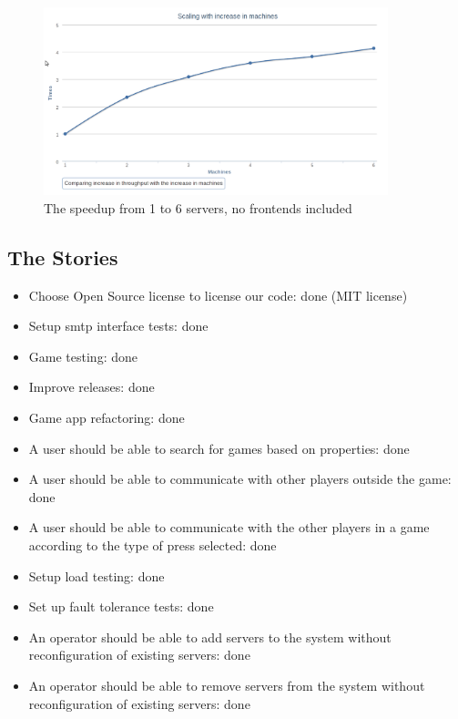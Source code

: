 \documentclass[11pt,a4paper]{article}
\begin{document}
\begin{figure}[h]
 \centering
 \includegraphics[width=10cm,keepaspectratio=true]{./scale.png}
 \caption{The speedup from 1 to 6 servers, no frontends included}
 \label{fig:speedup}
\end{figure}

\newpage

\subsection{The Stories}
\begin{itemize}
\item Choose Open Source license to license our code: done (MIT license)
\item Setup smtp interface tests: done
\item Game testing: done
\item Improve releases: done
\item Game app refactoring: done
\item A user should be able to search for games based on properties: done
\item A user should be able to communicate with other players outside the game: done
\item A user should be able to communicate with the other players in a game according to the type of press selected: done
\item Setup load testing: done
\item Set up fault tolerance tests: done
\item An operator should be able to add servers to the system without reconfiguration of existing servers: done
\item An operator should be able to remove servers from the system without reconfiguration of existing servers: done
\end{itemize}
\end{document}
